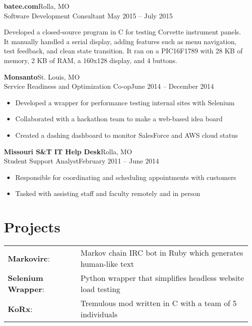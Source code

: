 \documentclass[margin]{res}
\newcommand{\github}[0]%
{%
  \hspace{-4mm}\faGithubSign\hspace{1mm}%
}
\begin{document}
\begin{resume}
    \textbf{batee.com}\hfill  Rolla, MO\\
       Software Development Consultant \hfill May 2015 -- July 2015\\
       \vspace{-1em}
       \begin{addmargin}[2.5em]{0em}
         Developed a closed-source program in C for testing Corvette instrument panels. 
         It manually handled a serial display, adding features such as menu navigation, 
         test feedback, and clean state transition. It ran on a PIC16F1789 with 28 KB of memory, 
         2 KB of RAM, a 160x128 display, and 4 buttons.
       \end{addmargin}
       
       \textbf{Monsanto}\hfill St. Louis, MO\\
       Service Readiness and Optimization Co-op\hfill June 2014 -- December 2014
       \begin{itemize} \itemsep -1pt  %
         \item Developed a wrapper for performance testing internal sites with Selenium
         \item Collaborated with a hackathon team to make a web-based idea board 
         \item Created a dashing dashboard to monitor SalesForce and AWS cloud status
       \end{itemize}
     
       \textbf{Missouri S\&T IT Help Desk}\hfill Rolla, MO\\
       Student Support Analyst\hfill February 2011 -- June 2014
       \begin{itemize} \itemsep -1pt  %
         \item Responsible for coordinating and scheduling appointments with customers
         \item Tasked with assisting staff and faculty remotely and in person
       \end{itemize}

    \section{Projects} 
      \begin{tabular}{l p{4in}}
        \github\textbf{Markovirc}:            & Markov chain IRC bot in Ruby which generates human-like text \\ [1pt]
        \github\textbf{Selenium Wrapper}:     & Python wrapper that simplifies headless website load testing \\ [1pt]
        \textbf{KoRx}:                        & Tremulous mod written in C with a team of 5 individuals \\ [1pt]
      \end{tabular}


\end{resume}
\end{document}
